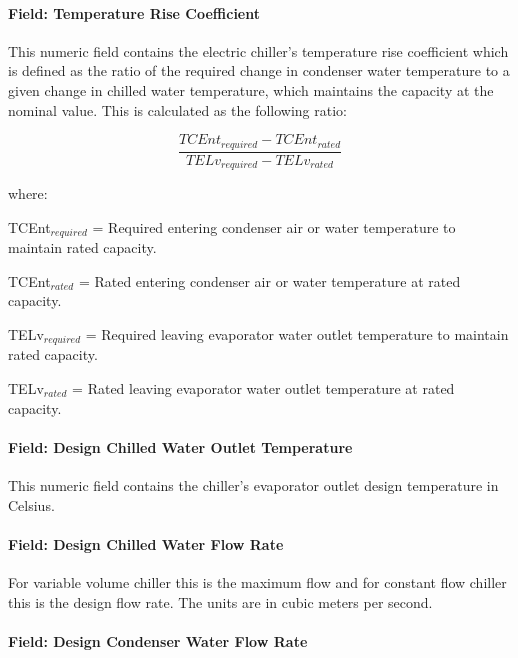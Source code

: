 \paragraph{Field: Temperature Rise Coefficient}\label{field-temperature-rise-coefficient-1}

This numeric field contains the electric chiller's temperature rise coefficient which is defined as the ratio of the required change in condenser water temperature to a given change in chilled water temperature, which maintains the capacity at the nominal value. This is calculated as the following ratio:

\begin{equation}
    \frac{{TCEn{t_{required}} - TCEn{t_{rated}}}}{{TEL{v_{required}} - TEL{v_{rated}}}}
\end{equation}

where:

TCEnt\(_{required}\) = Required entering condenser air or water temperature to maintain rated capacity.

TCEnt\(_{rated}\) = Rated entering condenser air or water temperature at rated capacity.

TELv\(_{required}\) = Required leaving evaporator water outlet temperature to maintain rated capacity.

TELv\(_{rated}\) = Rated leaving evaporator water outlet temperature at rated capacity.

\paragraph{Field: Design Chilled Water Outlet Temperature}\label{field-design-chilled-water-outlet-temperature-1}

This numeric field contains the chiller's evaporator outlet design temperature in Celsius.

\paragraph{Field: Design Chilled Water Flow Rate}\label{field-design-chilled-water-flow-rate-4}

For variable volume chiller this is the maximum flow and for constant flow chiller this is the design flow rate. The units are in cubic meters per second.

\paragraph{Field: Design Condenser Water Flow Rate}\label{field-design-condenser-water-flow-rate-3}

